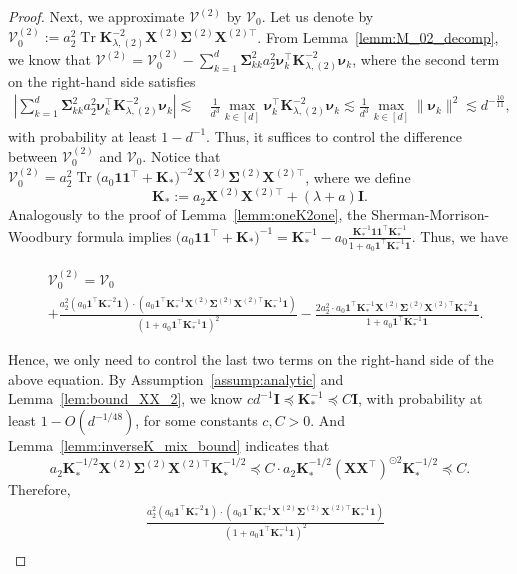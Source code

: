 \documentclass[twoside,11pt]{article}
\def\bI{{\mathbf I}}
\def\bK{{\boldsymbol K}}
\def\bX{{\boldsymbol X}}
\def\bSigma{{\boldsymbol \Sigma}}
\def\cV{{\mathcal V}}
\def\cV{{\mathcal V}}
\renewcommand{\bK}{\boldsymbol{K}}
\newcommand{\Tr}{\operatorname{Tr}}
\newcommand{\vnu}{\mbi{\nu}}
\newcommand{\1}{\mathbf{1}}
\def\mbi#1{\boldsymbol{#1}}
\def\mbi#1{\boldsymbol{#1}} %
\begin{document}
\begin{proof}
Next, we approximate $\cV^{(2)}$ by $\cV_0$. Let us denote by $\cV_0^{(2)}:=a_2^2\Tr\bK _{\lambda,(2)}^{-2} \bX^{(2)}\bSigma^{(2)}\bX^{(2)\top}$. From Lemma~\ref{lemm:M_02_decomp}, we know that
$
    \cV^{(2)}= \cV_0^{(2)}- \sum_{k=1}^d\bSigma_{kk}^2a_2^2 \vnu_k^\top  \bK _{\lambda,(2)}^{-2} \vnu_k$, where the second term on the right-hand side satisfies
\begin{align}
    \left|\sum_{k=1}^d\bSigma_{kk}^2a_2^2 \vnu_k^\top  \bK _{\lambda,(2)}^{-2} \vnu_k\right|\lesssim ~& \frac{1}{d^3} \max_{k\in [d]} \vnu_k^\top  \bK _{\lambda,(2)}^{-2} \vnu_k \lesssim \frac{1}{d^3} \max_{k\in [d]} \|\vnu_k\|^2 \lesssim d^{-\frac{10}{11}},\label{eq:V-V(2)4}
\end{align} with probability at least $1-d^{-1}$. Thus, it suffices to control the difference between $\cV_0^{(2)}$ and $\cV_0$. Notice that 
$
   \cV_0^{(2)} =  a_2^2\Tr \big(a_0\1\1^\top+\bK_*\big)^{-2}  \bX^{(2)}\bSigma^{(2)}\bX^{(2)\top}$, where we define
\begin{equation}\label{eq:K_*_no_11}
    \bK_*:=a_2\bX^{(2)}\bX^{(2)\top}+(\lambda+a )\bI.
\end{equation}
Analogously to the proof of Lemma~\ref{lemm:oneK2one}, the Sherman-Morrison-Woodbury formula implies
$\big(a_0\1\1^\top+\bK_*\big)^{-1} =\bK_*^{-1}-a_0\frac{\bK_*^{-1}\1\1^\top\bK_*^{-1}}{1+a_0\1^\top\bK_*^{-1}\1}.
$ Thus, we have
\begin{small}
\begin{align}
   &\cV_0^{(2)} = \cV_0\\
  &   +\frac{a_2^2 (a_0\1^\top \bK_*^{-2}\1)\cdot (a_0\1^\top \bK_*^{-1}\bX^{(2)}\bSigma^{(2)}\bX^{(2)\top}\bK_*^{-1}\1)}{(1+a_0\1^\top\bK_*^{-1}\1)^2} -\frac{2a_2^2\cdot a_0\1^\top \bK_*^{-1}\bX^{(2)}\bSigma^{(2)}\bX^{(2)\top}\bK_*^{-2}\1 }{1+a_0\1^\top\bK_*^{-1}\1}.
\end{align}
\end{small}
Hence, we only need to control the last two terms on the right-hand side of the above equation.
By Assumption~\ref{assump:analytic} and Lemma~\ref{lem:bound_XX_2}, we know 
$cd^{-1}\bI\preccurlyeq \bK_*^{-1}\preccurlyeq C\bI$,
 with probability at least $1-O(d^{-1/48})$, for some constants $c,C>0$. And Lemma~\ref{lemm:inverseK_mix_bound} indicates that
\[a_2\bK_*^{-1/2}\bX^{(2)}\bSigma^{(2)}\bX^{(2)\top}\bK_*^{-1/2}\preccurlyeq C\cdot a_2\bK_*^{-1/2}(\bX\bX^\top)^{\odot 2} \bK_*^{-1/2}\preccurlyeq C.\]
Therefore, 
\begin{align}
    &\frac{a_2^2 (a_0\1^\top \bK_*^{-2}\1)\cdot (a_0\1^\top \bK_*^{-1}\bX^{(2)}\bSigma^{(2)}\bX^{(2)\top}\bK_*^{-1}\1) }{(1+a_0\1^\top\bK_*^{-1}\1)^2}\\

\end{align}
\end{proof}
\end{document}

